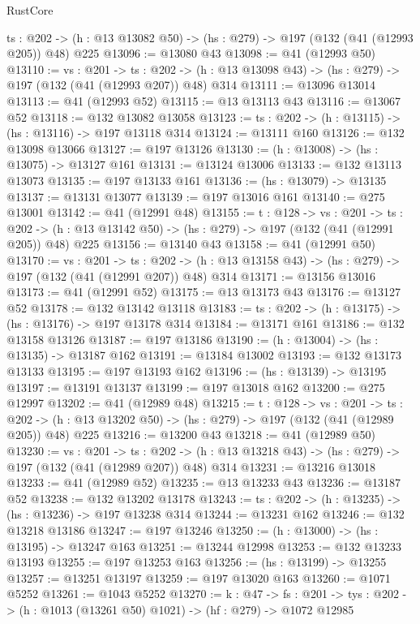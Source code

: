 \begin{lexlean}{RustCore}
\begin{coremodule}
  {ts : @202} -> (h : @13 @13082 @50) -> (hs : @279) -> @197 (@132 (@41 (@12993 @205)) @48) @225
@13096 := @13080 @43
@13098 := @41 (@12993 @50)
@13110 := {vs : @201} ->
  {ts : @202} -> (h : @13 @13098 @43) -> (hs : @279) -> @197 (@132 (@41 (@12993 @207)) @48) @314
@13111 := @13096 @13014
@13113 := @41 (@12993 @52)
@13115 := @13 @13113 @43
@13116 := @13067 @52
@13118 := @132 @13082 @13058
@13123 := {ts : @202} -> (h : @13115) -> (hs : @13116) -> @197 @13118 @314
@13124 := @13111 @160
@13126 := @132 @13098 @13066
@13127 := @197 @13126
@13130 := (h : @13008) -> (hs : @13075) -> @13127 @161
@13131 := @13124 @13006
@13133 := @132 @13113 @13073
@13135 := @197 @13133 @161
@13136 := (hs : @13079) -> @13135
@13137 := @13131 @13077
@13139 := @197 @13016 @161
@13140 := @275 @13001
@13142 := @41 (@12991 @48)
@13155 := {t : @128} ->
  {vs : @201} ->
  {ts : @202} -> (h : @13 @13142 @50) -> (hs : @279) -> @197 (@132 (@41 (@12991 @205)) @48) @225
@13156 := @13140 @43
@13158 := @41 (@12991 @50)
@13170 := {vs : @201} ->
  {ts : @202} -> (h : @13 @13158 @43) -> (hs : @279) -> @197 (@132 (@41 (@12991 @207)) @48) @314
@13171 := @13156 @13016
@13173 := @41 (@12991 @52)
@13175 := @13 @13173 @43
@13176 := @13127 @52
@13178 := @132 @13142 @13118
@13183 := {ts : @202} -> (h : @13175) -> (hs : @13176) -> @197 @13178 @314
@13184 := @13171 @161
@13186 := @132 @13158 @13126
@13187 := @197 @13186
@13190 := (h : @13004) -> (hs : @13135) -> @13187 @162
@13191 := @13184 @13002
@13193 := @132 @13173 @13133
@13195 := @197 @13193 @162
@13196 := (hs : @13139) -> @13195
@13197 := @13191 @13137
@13199 := @197 @13018 @162
@13200 := @275 @12997
@13202 := @41 (@12989 @48)
@13215 := {t : @128} ->
  {vs : @201} ->
  {ts : @202} -> (h : @13 @13202 @50) -> (hs : @279) -> @197 (@132 (@41 (@12989 @205)) @48) @225
@13216 := @13200 @43
@13218 := @41 (@12989 @50)
@13230 := {vs : @201} ->
  {ts : @202} -> (h : @13 @13218 @43) -> (hs : @279) -> @197 (@132 (@41 (@12989 @207)) @48) @314
@13231 := @13216 @13018
@13233 := @41 (@12989 @52)
@13235 := @13 @13233 @43
@13236 := @13187 @52
@13238 := @132 @13202 @13178
@13243 := {ts : @202} -> (h : @13235) -> (hs : @13236) -> @197 @13238 @314
@13244 := @13231 @162
@13246 := @132 @13218 @13186
@13247 := @197 @13246
@13250 := (h : @13000) -> (hs : @13195) -> @13247 @163
@13251 := @13244 @12998
@13253 := @132 @13233 @13193
@13255 := @197 @13253 @163
@13256 := (hs : @13199) -> @13255
@13257 := @13251 @13197
@13259 := @197 @13020 @163
@13260 := @1071 @5252
@13261 := @1043 @5252
@13270 := {k : @47} ->
  {fs : @201} -> {tys : @202} -> (h : @1013 (@13261 @50) @1021) -> (hf : @279) -> @1072 @12985

\end{coremodule}
\end{lexlean}
